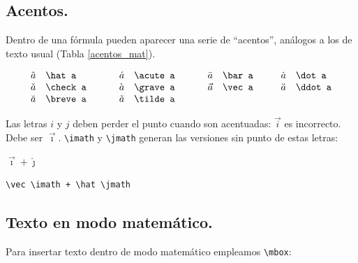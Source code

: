\subsection{Acentos.}

Dentro de una f{\'o}rmula pueden aparecer una serie de ``acentos'',
an{\'a}logos a los de texto usual (Tabla \ref{acentos_mat}).

\begin{table}
$$
\begin{array}{ll@{\hspace{1cm}}ll@{\hspace{1cm}}ll@{\hspace{1cm}}ll}
\hat a & \verb+\hat a+ &
\acute a & \verb+\acute a+ &
\bar a & \verb+\bar a+ &
\dot a & \verb+\dot a+ \\
\check a  & \verb+\check a + &
\grave a  & \verb+\grave a + &
\vec a & \verb+\vec a+ &
\ddot a & \verb+\ddot a+ \\
\breve a & \verb+\breve a+ &
\tilde a & \verb+\tilde a+ \\
\end{array}
$$
\caption{Acentos matem{\'a}ticos}
\label{acentos_mat}
\end{table}

Las letras $i$ y $j$ deben perder el punto cuando son acentuadas:
$\vec i$ es incorrecto. Debe ser $\vec\imath$. \verb+\imath+ y
\verb+\jmath+ generan las versiones sin punto de estas letras:

\vspace{.3cm}
{\small
\begin{minipage}[t]{5cm}
$\vec \imath + \hat \jmath $
\end{minipage}
\hspace{2cm}
\begin{minipage}[t]{5cm}
\begin{verbatim}
\vec \imath + \hat \jmath
\end{verbatim}
\end{minipage}
}
\vspace{.3cm}

\subsection{Texto en modo matem{\'a}tico.}
\label{texto_matematico_mbox}

Para insertar texto dentro de modo matem{\'a}tico empleamos
\verb+\mbox+: 

